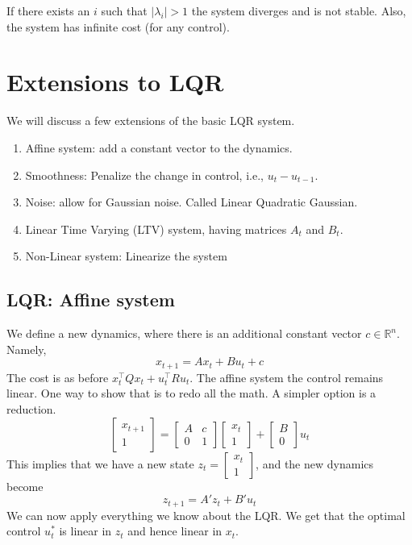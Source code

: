 If there exists an $i$ such that $|\lambda_i|>1$ the system diverges
and is not stable. Also, the system has infinite cost (for any
control).

\section{Extensions to LQR}

We will discuss a few extensions of the basic LQR system.
\begin{enumerate}
\item
Affine system: add a constant vector to the dynamics.
\item
Smoothness: Penalize the change in control, i.e., $u_t-u_{t-1}$.
\item
Noise: allow for Gaussian noise. Called Linear Quadratic Gaussian.
\item
Linear Time Varying (LTV) system, having matrices $A_t$ and
$B_t$.
\item
Non-Linear system: Linearize the system
\end{enumerate}

\subsection{LQR: Affine system}

We define a new dynamics, where there is an additional constant
vector $c\in\mathbb{R}^n$. Namely,
\[
x_{t+1}=Ax_t+Bu_t+c
\]
The cost is as before $x_t^\top Qx_t+u_t^\top Ru_t$.  The affine
system the control remains linear. One way to show that is to redo
all the math. A simpler option is a reduction.
\[
\begin{bmatrix}
x_{t+1}\\
1
\end{bmatrix}
=\begin{bmatrix}
A&c\\
0&1
\end{bmatrix}
\begin{bmatrix}
x_{t}\\
1
\end{bmatrix}+
\begin{bmatrix}
B\\
0
\end{bmatrix}
u_t
\]
This implies that we have a new state $z_t=\begin{bmatrix}
x_{t}\\
1
\end{bmatrix}$, and the new dynamics become
\[
z_{t+1}=A'z_t+B'u_t
\]
We can now apply everything we know about the LQR. We get that the
optimal control $u^*_t$ is linear in $z_t$ and hence linear in
$x_t$.

